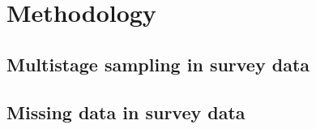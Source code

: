 \section{Methodology}

\subsection{Multistage sampling in survey data}

\subsection{Missing data in survey data} 

\endinput
